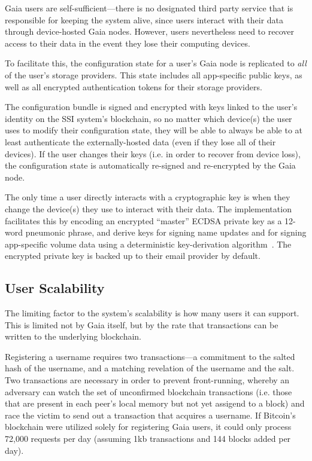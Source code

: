 Gaia users are self-sufficient---there is no designated third party service that is
responsible for keeping the system alive, since users interact with their data
through device-hosted Gaia nodes.  However, users nevertheless need to recover
access to their data in the event they lose their computing devices.

To facilitate this, the configuration state for a user's Gaia node is replicated to \textit{all} of
the user's storage providers.  This state includes all app-specific public keys,
as well as all encrypted authentication tokens for their storage providers.

The configuration bundle is signed and encrypted with keys linked to
the user's identity on the SSI system's blockchain, so no matter which device(s) the user
uses to modify their configuration state, they will be able to always be able to
at least authenticate the externally-hosted data (even if they lose all of their
devices).  If the user changes their keys (i.e. in order to recover from device
loss), the configuration state is
automatically re-signed and re-encrypted by the Gaia node.

The only time a user directly interacts with a cryptographic key is when they
change the device(s) they use to interact with their data.
The implementation facilitates this by
encoding an encrypted ``master'' ECDSA private key as a 12-word pneumonic phrase, and derive keys
for signing name updates and for signing app-specific volume data
using a deterministic key-derivation
algorithm~\cite{bip39}.  The encrypted private key is backed up to their email provider by
default.

\subsection{User Scalability}

The limiting factor to the system's scalability is how many users it can support.
This is limited not by Gaia itself, but by the rate that transactions can be
written to the underlying blockchain.

Registering a username requires two
transactions---a commitment to the salted hash of the username, and a matching
revelation of the username and the salt.  Two transactions are necessary in
order to prevent front-running, whereby an adversary can watch the set of
unconfirmed blockchain transactions (i.e. those that are present in each peer's
local memory but not yet assigend to a block) and race the victim to send out
a transaction that acquires a username.  If Bitcoin's blockchain were utilized
solely for registering Gaia users, it could only process 72,000 requests per day
(assuming 1kb transactions and 144 blocks added per day).

